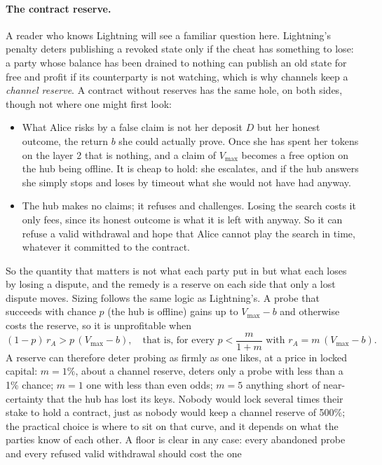 \documentclass[11pt]{article}
\newcommand{\vmax}{V_{\max}}
\begin{document}
\paragraph{The contract reserve.} A reader who knows Lightning will see
a familiar question here. Lightning's penalty deters publishing a
revoked state only if the cheat has something to lose: a party whose
balance has been drained to nothing can publish an old state for free
and profit if its counterparty is not watching, which is why channels
keep a \emph{channel reserve}. A contract without reserves has the same
hole, on both sides, though not where one might first look:
\begin{itemize}[leftmargin=1.5em]
\item What Alice risks by a false claim is not her deposit $D$ but her
  honest outcome, the return $b$ she could actually prove. Once she has
  spent her tokens on the layer 2 that is nothing, and a claim of
  $\vmax$ becomes a free option on the hub being offline. It is cheap to
  hold: she escalates, and if the hub answers she simply stops and loses
  by timeout what she would not have had anyway.
\item The hub makes no claims; it refuses and challenges. Losing the
  search costs it only fees, since its honest outcome is what it is left
  with anyway. So it can refuse a valid withdrawal and hope that Alice
  cannot play the search in time, whatever it committed to the
  contract.
\end{itemize}
So the quantity that matters is not what each party put in but what
each loses by losing a dispute, and the remedy is a reserve on each
side that only a lost dispute moves. Sizing follows the same logic as
Lightning's. A probe that succeeds with chance $p$ (the hub is offline)
gains up to $\vmax - b$ and otherwise costs the reserve, so it is
unprofitable when
\[
  (1-p)\, r_A > p\,(\vmax - b), \quad\text{that is, for every } p < \frac{m}{1+m} \text{ with } r_A = m\,(\vmax - b).
\]
A reserve can therefore deter probing as firmly as one likes, at a price
in locked capital: $m = 1\%$, about a channel reserve, deters only a
probe with less than a 1\% chance; $m = 1$ one with less than even
odds; $m = 5$ anything short of near-certainty that the hub has lost
its keys. Nobody would lock several times their stake to hold a contract,
just as nobody would keep a channel reserve of 500\%; the practical
choice is where to sit on that curve, and it depends on what the
parties know of each other. A floor is clear in any case: every
abandoned probe and every refused valid withdrawal should cost the one
\end{document}
